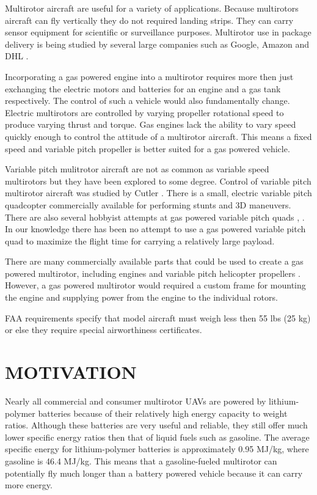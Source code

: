\documentclass[letterpaper, 10 pt, conference]{ieeeconf}  %
\begin{document}
Multirotor aircraft are useful for a variety of applications.  Because multirotors aircraft can fly vertically they do not required landing strips.  They can carry sensor equipment for scientific or surveillance purposes. Multirotor use in package delivery is being studied by several large companies such as Google, Amazon and DHL \cite{Amazon2014}.   

Incorporating a gas powered engine into a multirotor requires more then just exchanging the electric motors and batteries for an engine and a gas tank respectively. The control of such a vehicle would also fundamentally change.  Electric multirotors are controlled by varying propeller rotational speed to produce varying thrust and torque. Gas engines lack the ability to vary speed quickly enough to control the attitude of a multirotor aircraft. This means a fixed speed and variable pitch propeller is better suited for a gas powered vehicle.

Variable pitch mulitrotor aircraft are not as common as variable speed multirotors but they have been explored to some degree. Control of variable pitch multirotor aircraft was studied by Cutler \cite{Cutler2012}. There is a small, electric variable pitch quadcopter commercially available \cite{stingray2016} for performing stunts and 3D maneuvers.  There are also several hobbyist attempts at gas powered variable pitch quads \cite{diy2016}, \cite{hackaday2016}. In our knowledge there has been no attempt to use a gas powered variable pitch quad to maximize the flight time for carrying a relatively large payload. 

There are many commercially available parts that could be used to create a gas powered multirotor, including engines \cite{da2016} and variable pitch helicopter propellers \cite{align2016}. However, a gas powered multirotor would required a custom frame for mounting the engine and supplying power from the engine to the individual rotors.

FAA requirements \cite{faa2016} specify that model aircraft must weigh less then 55 lbs (25 kg) or else they require special airworthiness certificates.

\section{MOTIVATION}

Nearly all commercial and consumer multirotor UAVs are powered by lithium-polymer batteries because of their relatively high energy capacity to weight ratios. Although these batteries are very useful and reliable, they still offer much lower specific energy ratios then that of liquid fuels such as gasoline. The average specific energy for lithium-polymer batteries is approximately 0.95 MJ/kg, where gasoline is 46.4 MJ/kg. This means that a gasoline-fueled multirotor can potentially fly much longer than a battery powered vehicle because it can carry more energy.  %
\end{document}
